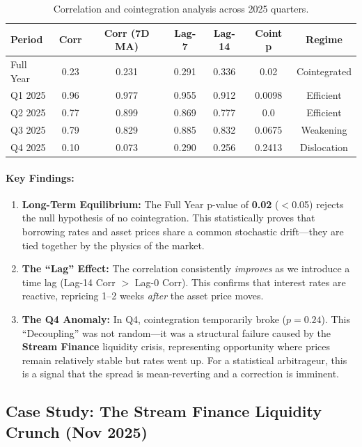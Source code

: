\documentclass[12pt]{article}
\begin{document}
\begin{table}[H]
\centering
\caption{Correlation and cointegration analysis across 2025 quarters.}
\small
\begin{tabular}{@{}lcccccc@{}}
\toprule
\textbf{Period} & \textbf{Corr} & \textbf{Corr (7D MA)} & \textbf{Lag-7} & \textbf{Lag-14} & \textbf{Coint p} & \textbf{Regime} \\
\midrule
Full Year & 0.23  & 0.231 & 0.291 & 0.336 & 0.02   & Cointegrated \\
Q1 2025   & 0.96  & 0.977 & 0.955 & 0.912 & 0.0098 & Efficient \\
Q2 2025   & 0.77  & 0.899 & 0.869 & 0.777 & 0.0    & Efficient \\
Q3 2025   & 0.79  & 0.829 & 0.885 & 0.832 & 0.0675 & Weakening \\
Q4 2025   & 0.10  & 0.073 & 0.290 & 0.256 & 0.2413 & Dislocation \\
\bottomrule
\end{tabular}
\end{table}

\paragraph{Key Findings:}

\begin{enumerate}
    \item \textbf{Long-Term Equilibrium:} The Full Year p-value of \textbf{0.02} ($<$0.05) rejects the null hypothesis of no cointegration. This statistically proves that borrowing rates and asset prices share a common stochastic drift---they are tied together by the physics of the market.
    \item \textbf{The ``Lag'' Effect:} The correlation consistently \emph{improves} as we introduce a time lag (Lag-14 Corr $>$ Lag-0 Corr). This confirms that interest rates are reactive, repricing 1--2 weeks \emph{after} the asset price moves.
    \item \textbf{The Q4 Anomaly:} In Q4, cointegration temporarily broke ($p=0.24$). This ``Decoupling'' was not random---it was a structural failure caused by the \textbf{Stream Finance} liquidity crisis, representing opportunity where prices remain relatively stable but rates went up. For a statistical arbitrageur, this is a signal that the spread is mean-reverting and a correction is imminent.
\end{enumerate}

\subsection{Case Study: The Stream Finance Liquidity Crunch (Nov 2025)}
\end{document}
